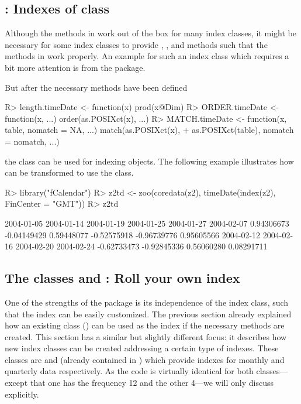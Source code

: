 \documentclass{Z}
\begin{document}
\subsection[fCalendar: Indexes of class "timeDate"]{: Indexes of class }
\label{sec:fCalendar}

Although the methods in  work out of the box for many index classes,
it might be necessary for some index classes to provide , ,
 and  methods such that the methods in  
work properly. An example for such an index class which requires a bit more
attention is  from the  package.

But after the necessary methods have been defined
\begin{Schunk}
\begin{Sinput}
R> length.timeDate <- function(x) prod(x@Dim)
R> ORDER.timeDate <- function(x, ...) order(as.POSIXct(x), ...)
R> MATCH.timeDate <- function(x, table, nomatch = NA, ...) match(as.POSIXct(x), 
+     as.POSIXct(table), nomatch = nomatch, ...)
\end{Sinput}
\end{Schunk}
the class  can be used for indexing  objects.
The following example illustrates how  can be transformed
to use the  class.
\begin{Schunk}
\begin{Sinput}
R> library("fCalendar")
R> z2td <- zoo(coredata(z2), timeDate(index(z2), FinCenter = "GMT"))
R> z2td
\end{Sinput}
\begin{Soutput}
 2004-01-05  2004-01-14  2004-01-19  2004-01-25  2004-01-27  2004-02-07 
 0.94306673 -0.04149429  0.59448077 -0.52575918 -0.96739776  0.95605566 
 2004-02-12  2004-02-16  2004-02-20  2004-02-24 
-0.62733473 -0.92845336  0.56060280  0.08291711 
\end{Soutput}
\end{Schunk}

\subsection[The classes "yearmon" and "yearqtr": Roll your own index]{The classes  and : Roll your own index}
\label{sec:yearmon}

One of the strengths of the  package is its independence of the
index class, such that the index can be easily customized. The previous section
already explained how an existing class () can be used as
the index if the necessary methods are created. This section has a similar
but slightly different focus: it describes how new index classes can be created
addressing a certain type of indexes. These classes are  and
 (already contained in ) which provide indexes for
monthly and quarterly data respectively.
As the code is virtually identical for both classes---except that one has the 
frequency 12 and the other 4---we will only discuss  explicitly.
\end{document}
